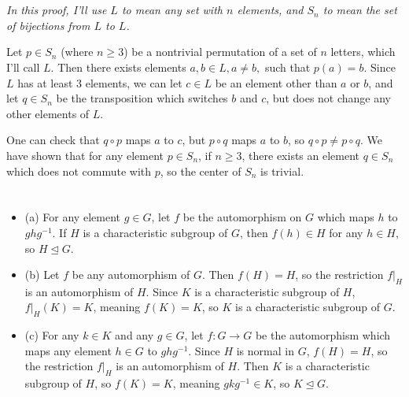 \documentclass[12pt]{article}
\begin{document}
\section{}
\noindent{}\bigskip

\textit{In this proof, I'll use $L$ to mean any set with $n$ elements, and $S_n$ to mean the set of bijections from $L$ to $L$.}
\par
Let $p \in S_n$ (where $n \geq 3$) be a nontrivial permutation of a set of $n$ letters, which I'll call $L$. Then there exists elements $a, b \in L, a \neq b,$ such that $p(a) = b$. Since $L$ has at least 3 elements, we can let $c \in L$ be an element other than $a$ or $b$, and let $q \in S_n$ be the transposition which switches $b$ and $c$, but does not change any other elements of $L$.
\par
One can check that $q \circ p$ maps $a$ to $c$, but $p \circ q$ maps $a$ to $b$, so $q \circ p \neq p \circ q$. We have shown that for any element $p \in S_n$, if $n \geq 3$, there exists an element $q \in S_n$ which does not commute with $p$, so the center of $S_n$ is trivial.

\section{}
\noindent{}\bigskip

\begin{itemize}
    \item (a) For any element $g \in G$, let $f$ be the automorphism on $G$ which maps $h$ to $ghg^{-1}$. If $H$ is a characteristic subgroup of $G$, then $f(h) \in H$ for any $h \in H$, so $H \trianglelefteq G$.
    \item (b) Let $f$ be any automorphism of $G$. Then $f(H)=H$, so the restriction $f|_H$ is an automorphism of $H$. Since $K$ is a characteristic subgroup of $H$, $f|_H(K)=K$, meaning $f(K)=K$, so $K$ is a characteristic subgroup of $G$.
    \item (c) For any $k \in K$ and any $g \in G$, let $f: G \rightarrow G$ be the automorphism which maps any element $h \in G$ to $ghg^{-1}$. Since $H$ is normal in $G$, $f(H)=H$, so the restriction $f|_H$ is an automorphism of $H$. Then $K$ is a characteristic subgroup of $H$, so $f(K)=K$, meaning $gkg^{-1}\in K$, so $K \trianglelefteq G$.
\end{itemize}
\end{document}

